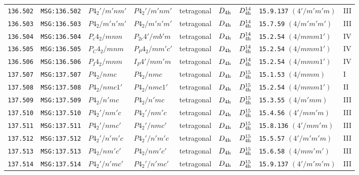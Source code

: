 \documentclass[fleqn,10pt]{jsarticle}
\begin{document}
\begin{center}
\begin{longtable}{lllllllll}
\texttt{136.502} & \texttt{MSG:136.502} & $P4_{2}'/m'nm'$ & $P4_{2}'/m'nm'$ & tetragonal & $D_{\rm 4h}$ & $D_{\rm 4h}^{14}$ & \texttt{15.9.137} $(4'/m'm'm)$ & III \\
\texttt{136.503} & \texttt{MSG:136.503} & $P4_{2}/m'n'm'$ & $P4_{2}/m'n'm'$ & tetragonal & $D_{\rm 4h}$ & $D_{\rm 4h}^{14}$ & \texttt{15.7.59} $(4/m'm'm')$ & III \\
\texttt{136.504} & \texttt{MSG:136.504} & $P_{c}4_{2}/mnm$ & $P_{2c}4'/mb'm$ & tetragonal & $D_{\rm 4h}$ & $D_{\rm 4h}^{14}$ & \texttt{15.2.54} $(4/mmm1')$ & IV \\
\texttt{136.505} & \texttt{MSG:136.505} & $P_{C}4_{2}/mnm$ & $P_{P}4_{2}/mm'c'$ & tetragonal & $D_{\rm 4h}$ & $D_{\rm 4h}^{14}$ & \texttt{15.2.54} $(4/mmm1')$ & IV \\
\texttt{136.506} & \texttt{MSG:136.506} & $P_{I}4_{2}/mnm$ & $I_{P}4'/mm'm$ & tetragonal & $D_{\rm 4h}$ & $D_{\rm 4h}^{14}$ & \texttt{15.2.54} $(4/mmm1')$ & IV \\ \hline
\texttt{137.507} & \texttt{MSG:137.507} & $P4_{2}/nmc$ & $P4_{2}/nmc$ & tetragonal & $D_{\rm 4h}$ & $D_{\rm 4h}^{15}$ & \texttt{15.1.53} $(4/mmm)$ & I \\
\texttt{137.508} & \texttt{MSG:137.508} & $P4_{2}/nmc1'$ & $P4_{2}/nmc1'$ & tetragonal & $D_{\rm 4h}$ & $D_{\rm 4h}^{15}$ & \texttt{15.2.54} $(4/mmm1')$ & II \\
\texttt{137.509} & \texttt{MSG:137.509} & $P4_{2}/n'mc$ & $P4_{2}/n'mc$ & tetragonal & $D_{\rm 4h}$ & $D_{\rm 4h}^{15}$ & \texttt{15.3.55} $(4/m'mm)$ & III \\
\texttt{137.510} & \texttt{MSG:137.510} & $P4_{2}'/nm'c$ & $P4_{2}'/nm'c$ & tetragonal & $D_{\rm 4h}$ & $D_{\rm 4h}^{15}$ & \texttt{15.4.56} $(4'/mm'm)$ & III \\
\texttt{137.511} & \texttt{MSG:137.511} & $P4_{2}'/nmc'$ & $P4_{2}'/nmc'$ & tetragonal & $D_{\rm 4h}$ & $D_{\rm 4h}^{15}$ & \texttt{15.8.136} $(4'/mm'm)$ & III \\
\texttt{137.512} & \texttt{MSG:137.512} & $P4_{2}'/n'm'c$ & $P4_{2}'/n'm'c$ & tetragonal & $D_{\rm 4h}$ & $D_{\rm 4h}^{15}$ & \texttt{15.5.57} $(4'/m'm'm)$ & III \\
\texttt{137.513} & \texttt{MSG:137.513} & $P4_{2}/nm'c'$ & $P4_{2}/nm'c'$ & tetragonal & $D_{\rm 4h}$ & $D_{\rm 4h}^{15}$ & \texttt{15.6.58} $(4/mm'm')$ & III \\
\texttt{137.514} & \texttt{MSG:137.514} & $P4_{2}'/n'mc'$ & $P4_{2}'/n'mc'$ & tetragonal & $D_{\rm 4h}$ & $D_{\rm 4h}^{15}$ & \texttt{15.9.137} $(4'/m'm'm)$ & III \\

\end{longtable}
\end{center}
\end{document}
